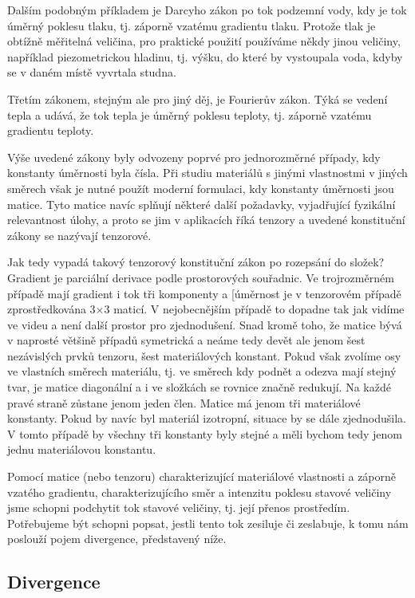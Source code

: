 \documentclass[12pt]{article}
\begin{document}
Dalším podobným příkladem je Darcyho zákon po tok podzemní vody, kdy je tok úměrný poklesu tlaku, tj. záporně vzatému gradientu tlaku. Protože tlak je obtížně měřitelná veličina, pro praktické použití používáme někdy jinou veličiny, například piezometrickou hladinu, tj. výšku, do které by vystoupala voda, kdyby se v daném místě vyvrtala studna.

Třetím zákonem, stejným ale pro jiný děj, je Fourierův zákon. Týká se vedení tepla a udává, že tok tepla je úměrný poklesu teploty, tj. záporně vzatému gradientu teploty.

Výše uvedené zákony byly odvozeny poprvé pro jednorozměrné případy, kdy konstanty úměrnosti byla čísla. Při studiu materiálů s jinými vlastnostmi v jiných směrech však je nutné použít moderní formulaci, kdy konstanty úměrnosti jsou matice. Tyto matice navíc splňují některé další požadavky, vyjadřující fyzikální relevantnost úlohy, a proto se jim v aplikacích říká tenzory a uvedené konstituční zákony se nazývají tenzorové.

Jak tedy vypadá takový tenzorový konstituční zákon po rozepsání do složek? Gradient je parciální derivace podle prostorových souřadnic. Ve trojrozměrném případě mají gradient i tok tři komponenty a [úměrnost je v tenzorovém případě zprostředkována 3$\times$3 maticí. V nejobecnějším případě to dopadne tak jak vidíme ve videu a není další prostor pro zjednodušení. Snad kromě toho, že matice bývá v naprosté většině případů symetrická a neáme tedy devět ale jenom šest nezávislých prvků tenzoru, šest materiálových konstant. Pokud však zvolíme osy ve vlastních směrech materiálu, tj. ve směrech kdy podnět a odezva mají stejný tvar, je matice diagonální a i ve složkách se rovnice značně redukují. Na každé pravé straně zůstane jenom jeden člen. Matice má jenom tři materiálové konstanty. Pokud by navíc byl materiál izotropní, situace by se dále zjednodušila. V tomto případě by všechny tři konstanty byly stejné a měli bychom tedy jenom jednu materiálovou konstantu.

Pomocí matice (nebo tenzoru) charakterizující materiálové vlastnosti a záporně vzatého gradientu, charakterizujícího směr a intenzitu poklesu stavové veličiny jsme schopni podchytit tok stavové veličiny, tj. její přenos prostředím. Potřebujeme být schopni popsat, jestli tento tok zesiluje či zeslabuje, k tomu nám poslouží pojem divergence, představený níže. 

\subsection{Divergence}
\end{document}
